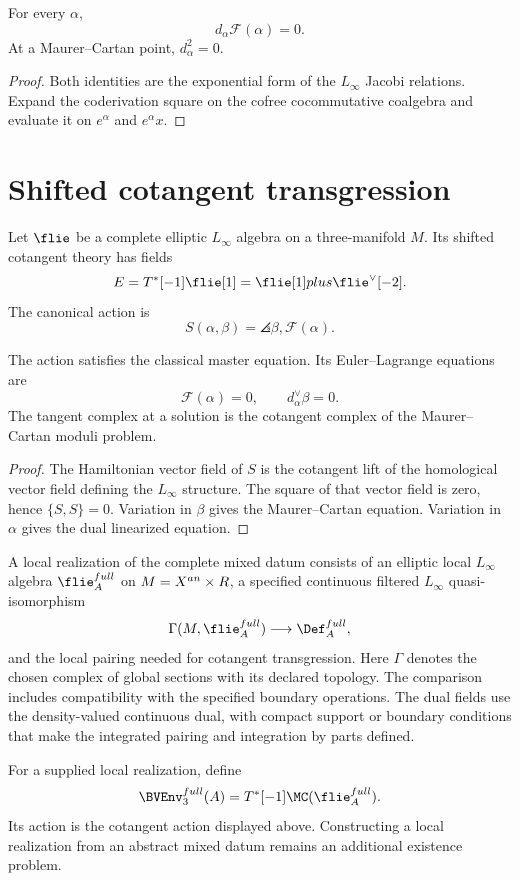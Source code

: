 \begin{theorem}
For every $\alpha$,
\[
 d_\alpha\mathcal F(\alpha)=0.
\]
At a Maurer--Cartan point, $d_\alpha^2=0$.
\end{theorem}
\begin{proof}
Both identities are the exponential form of the $L_\infty$ Jacobi relations.  Expand the coderivation square on the cofree cocommutative coalgebra and evaluate it on $e^\alpha$ and $e^\alpha x$.
\end{proof}

\chapter{Shifted cotangent transgression}
Let $\flie$ be a complete elliptic $L_\infty$ algebra on a three-manifold $M$.  Its shifted cotangent theory has fields
\[
 \mathcal E=T^*[-1]\flie[1]
 =\flie[1]\oplus\flie^\vee[-2].
\]
The canonical action is
\[
 S(\alpha,\beta)
 =\angles{\beta,\mathcal F(\alpha)}.
\]

\begin{theorem}
The action satisfies the classical master equation.  Its Euler--Lagrange equations are
\[
 \mathcal F(\alpha)=0,
 \qquad
 d_\alpha^\vee\beta=0.
\]
The tangent complex at a solution is the cotangent complex of the Maurer--Cartan moduli problem.
\end{theorem}
\begin{proof}
The Hamiltonian vector field of $S$ is the cotangent lift of the homological vector field defining the $L_\infty$ structure.  The square of that vector field is zero, hence $\{S,S\}=0$.  Variation in $\beta$ gives the Maurer--Cartan equation.  Variation in $\alpha$ gives the dual linearized equation.
\end{proof}

\begin{definition}
A local realization of the complete mixed datum consists of an elliptic local $L_\infty$ algebra $\flie_{\mathbb A}^{\mathrm{full}}$ on $M=X^{an}\times R$, a specified continuous filtered $L_\infty$ quasi-isomorphism
\[
 \Gamma(M,\flie_{\mathbb A}^{\mathrm{full}})
 \longrightarrow \Def_{\mathbb A}^{\mathrm{full}},
\]
and the local pairing needed for cotangent transgression. Here $\Gamma$ denotes the chosen complex of global sections with its declared topology. The comparison includes compatibility with the specified boundary operations. The dual fields use the density-valued continuous dual, with compact support or boundary conditions that make the integrated pairing and integration by parts defined.

For a supplied local realization, define
\[
 \BVEnv_3^{\mathrm{full}}(\mathbb A)
 =T^*[-1]\MC(\flie_{\mathbb A}^{\mathrm{full}}).
\]
Its action is the cotangent action displayed above. Constructing a local realization from an abstract mixed datum remains an additional existence problem.
\end{definition}


